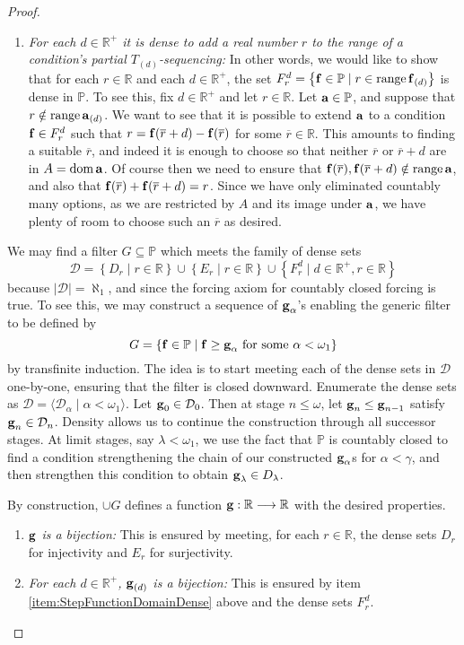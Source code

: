 \documentclass{amsart}
\theoremstyle{definition}
\theoremstyle{remark}
\renewcommand{\P}{\mathbb{P}}
\newcommand{\R}{\mathbb{R}}
\DeclareMathOperator{\ran}{range}
\DeclareMathOperator{\dom}{dom}
\newcommand{\st}{\; | \;}
\newcommand{\set}[2]{\left\{#1\st #2 \right\}}
\newcommand{\seq}[2]{\langle #1 \st #2 \rangle}
\newcommand{\To}{\longrightarrow}
\renewcommand{\a}{\textup{\textbf{a}}}
\newcommand{\g}{\textup{\textbf{g}}}
\newcommand{\f}{\textup{\textbf{f}}}
\renewcommand{\r}{\overline r}
\begin{document}
\begin{proof}
\begin{enumerate}
	\item \emph{For each $d \in \R^+$ it is dense to add a real number $r$ to the range of a condition's partial $T_{(d)}$-sequencing:} In other words, we would like to show that for each $r \in \R$ and each $d \in \R^+$, the set $F^d_r=\set{\f \in \P}{r \in \ran \f_{(d)}}$ is dense in $\P$. To see this, fix $d \in \R^+$ and let $r \in \R$. Let $\a \in \P$, and suppose that $r \notin \ran\a_{(d)}$. We want to see that it is possible to extend $\a$ to a condition $\f \in F^d_r$ such that $r=\f(\r+d)-\f(\r)$ for some $\r \in \R$. This amounts to finding a suitable $\r$, and indeed it is enough to choose so that neither $\r$ or $\r+d$ are in $A = \dom \a$. Of course then we need to ensure that $\f(\r), \f(\r+d) \notin \ran \a$, and also that $\f(\r)+\f(\r+d)=r$. Since we have only eliminated countably many options, as we are restricted by $A$ and its image under $\a$, we have plenty of room to choose such an $\r$ as desired.
\end{enumerate}

We may find a filter $G \subseteq \P$ which meets the family of dense sets $$\mathcal D = \set{D_r}{r\in \R} \cup \set{E_r}{r \in \R} \cup \set{F^d_r}{d \in \R^+, r \in \R}$$ because $|\mathcal D|=\aleph_1$, and since the forcing axiom for countably closed forcing is true. To see this, we may construct a sequence of $\g_\alpha$'s enabling the generic filter to be defined by $$G=\set{\f \in \P}{\f \geq \g_\alpha \text{ for some } \alpha<\omega_1}$$ by transfinite induction. The idea is to start meeting each of the dense sets in $\mathcal D$ one-by-one, ensuring that the filter is closed downward. Enumerate the dense sets as $\mathcal D = \seq{\mathcal D_\alpha}{\alpha<\omega_1}$. Let $\g_0 \in \mathcal D_0$. Then at stage $n \leq \omega$, let $\g_n \leq \g_{n-1}$ satisfy $\g_n \in \mathcal D_n$. Density allows us to continue the construction through all successor stages. At limit stages, say $\lambda <\omega_1$, we use the fact that $\P$ is countably closed to find a condition strengthening the chain of our constructed $\g_\alpha$s for $\alpha<\gamma$, and then strengthen this condition to obtain $\g_\lambda \in D_\lambda$.

By construction, $\cup G$ defines a function $\g: \R \To \R$ with the desired properties. \begin{enumerate}
	\item \emph{$\g$ is a bijection:} This is ensured by meeting, for each $r \in \R$, the dense sets $D_r$ for injectivity and $E_r$ for surjectivity.
	\item \emph{For each $d \in \R^+$, $\g_{(d)}$ is a bijection:} This is ensured by item \ref{item:StepFunctionDomainDense} above and the dense sets $F^d_r$.
\end{enumerate}
\end{proof}
					



%
\end{document}
